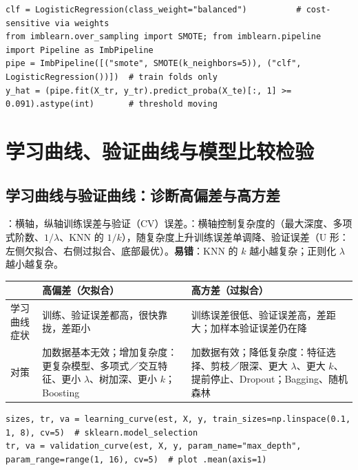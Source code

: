 \begin{lstlisting}[basicstyle=\ttfamily\footnotesize]
clf = LogisticRegression(class_weight="balanced")          # cost-sensitive via weights
from imblearn.over_sampling import SMOTE; from imblearn.pipeline import Pipeline as ImbPipeline
pipe = ImbPipeline([("smote", SMOTE(k_neighbors=5)), ("clf", LogisticRegression())])  # train folds only
y_hat = (pipe.fit(X_tr, y_tr).predict_proba(X_te)[:, 1] >= 0.091).astype(int)       # threshold moving
\end{lstlisting}

\section{学习曲线、验证曲线与模型比较检验}

\subsection{学习曲线与验证曲线：诊断高偏差与高方差}
：横轴，纵轴训练误差与验证（CV）误差。：横轴控制复杂度的（最大深度、多项式阶数、$1/\lambda$、KNN 的 $1/k$），随复杂度上升训练误差单调降、验证误差（U 形：左侧欠拟合、右侧过拟合、底部最优）。\textbf{易错}：KNN 的 $k$ 越小越复杂；正则化 $\lambda$ 越小越复杂。
\begin{center}\small\renewcommand{\arraystretch}{1.1}
\begin{tabularx}{\linewidth}{@{}p{2.2cm}LL@{}}
\toprule
 & 高偏差（欠拟合）& 高方差（过拟合）\\
\midrule
学习曲线症状 & 训练、验证误差都高，很快靠拢，差距小 & 训练误差很低、验证误差高，差距大；加样本验证误差仍在降 \\
对策 & 加数据基本无效；增加复杂度：更复杂模型、多项式／交互特征、更小 $\lambda$、树加深、更小 $k$；Boosting & 加数据有效；降低复杂度：特征选择、剪枝／限深、更大 $\lambda$、更大 $k$、提前停止、Dropout；Bagging、随机森林 \\
\bottomrule
\end{tabularx}
\end{center}
\begin{lstlisting}[basicstyle=\ttfamily\footnotesize]
sizes, tr, va = learning_curve(est, X, y, train_sizes=np.linspace(0.1, 1, 8), cv=5)  # sklearn.model_selection
tr, va = validation_curve(est, X, y, param_name="max_depth", param_range=range(1, 16), cv=5)  # plot .mean(axis=1)
\end{lstlisting}

